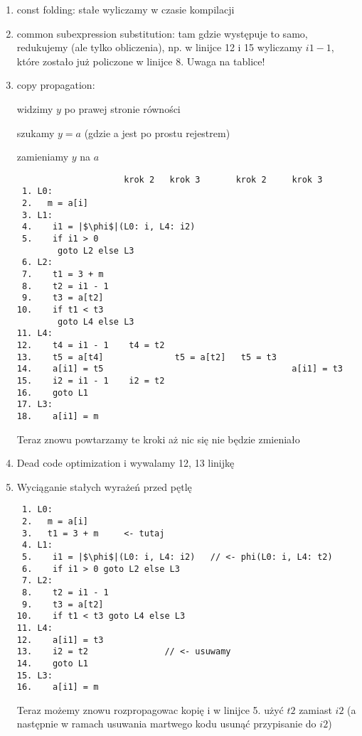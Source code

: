\begin{enumerate}
    \item const folding: stałe wyliczamy w czasie kompilacji
    \item common subexpression substitution: tam gdzie występuje to samo, redukujemy (ale tylko obliczenia), np. w linijce 12 i 15 wyliczamy $i1 - 1$, które zostało już policzone w linijce 8. Uwaga na tablice!
    
    \item copy propagation:
    
    widzimy $y$ po prawej stronie równości
    
    szukamy $y = a$ (gdzie a jest po prostu rejestrem)
    
    zamieniamy $y$ na $a$
    
    \begin{verbatim}
                     krok 2   krok 3       krok 2     krok 3
 1. L0:
 2.   m = a[i]
 3. L1:
 4.    i1 = |$\phi$|(L0: i, L4: i2)
 5.    if i1 > 0 
        goto L2 else L3
 6. L2:
 7.    t1 = 3 + m
 8.    t2 = i1 - 1
 9.    t3 = a[t2]
10.    if t1 < t3
        goto L4 else L3
11. L4:
12.    t4 = i1 - 1    t4 = t2
13.    t5 = a[t4]              t5 = a[t2]   t5 = t3
14.    a[i1] = t5                                     a[i1] = t3
15.    i2 = i1 - 1    i2 = t2
16.    goto L1
17. L3:
18.    a[i1] = m    
    \end{verbatim}
    
    
    Teraz znowu powtarzamy te kroki aż nic się nie będzie zmieniało

    \item Dead code optimization i wywalamy 12, 13 linijkę
    \item Wyciąganie stałych wyrażeń przed pętlę
        \begin{verbatim}
 1. L0:
 2.   m = a[i]
 3.   t1 = 3 + m     <- tutaj
 4. L1:
 5.    i1 = |$\phi$|(L0: i, L4: i2)   // <- phi(L0: i, L4: t2)
 6.    if i1 > 0 goto L2 else L3
 7. L2:
 8.    t2 = i1 - 1
 9.    t3 = a[t2]
10.    if t1 < t3 goto L4 else L3
11. L4:
12.    a[i1] = t3
13.    i2 = t2               // <- usuwamy
14.    goto L1
15. L3:
16.    a[i1] = m    
    \end{verbatim}
    
    Teraz możemy znowu rozpropagowac kopię i w linijce 5. użyć $t2$ zamiast $i2$ (a następnie w ramach usuwania martwego kodu usunąć przypisanie do $i2$)
    
    
\end{enumerate}
